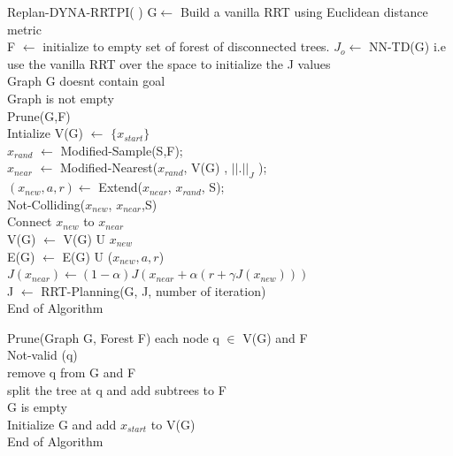\documentclass[MTech]{iitmdiss}
\begin{document}
\begin{algorithm}{Replan-DYNA-RRTPI( )}{
\label{algo:Replan-DYNA-RRTPI}
}
G$\leftarrow$ Build a vanilla RRT using Euclidean distance metric\\
F $\leftarrow$ initialize to empty set of forest of disconnected trees.
$J_o \leftarrow$ NN-TD(G) i.e use the vanilla RRT over the space to initialize the J values\\ 
\qwhile Graph G doesnt contain goal \\
\qif Graph is not empty \\
\qthen Prune(G,F)\\
\qelse Intialize V(G) $\leftarrow$ $\{x_{start} \}$\qfi\\
$x_{rand}$ $\leftarrow$ Modified-Sample(S,F);\\
$x_{near}$ $\leftarrow$ Modified-Nearest($x_{rand}$, V(G) , $|| . ||_J $ );\\
$(x_{new}, a, r) \leftarrow$ Extend($x_{near}$, $x_{rand}$, S);\\
\qif Not-Colliding($x_{new}$, $x_{near}$,S)\\
\qthen Connect $x_{new}$ to $x_{near}$\\
V(G) $\leftarrow$ V(G) U {$ x_{new}$ }\\
E(G) $\leftarrow$ E(G) U ($x_{new}, a, r$)\\
$J(x_{near}) \leftarrow (1 - \alpha) J (x_{near} + \alpha (r + \gamma J(x_{new})))$ \qfi\\
J $\leftarrow$ RRT-Planning(G, J, number of iteration)\qend\\
End of Algorithm
\end{algorithm}

\begin{algorithm}{Prune(Graph G, Forest F)}{
\label{algo:Prune}
}
\qfor each node q $\in$ V(G) and F\\
\qif Not-valid (q)\\
\qthen remove q from G and F\\
split the tree at q and add subtrees to F\qfi\qrof\\
\qif G is empty \\
\qthen Initialize G and add $x_{start}$ to V(G)\qfi\\
End of Algorithm
\end{algorithm}
\end{document}
